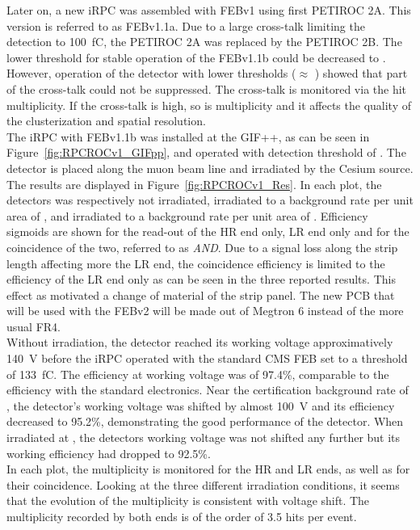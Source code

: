     Later on, a new iRPC was assembled with FEBv1 using first PETIROC 2A. This version is referred to as FEBv1.1a. Due to a large cross-talk limiting the detection to \SI{100}{fC}, the PETIROC 2A was replaced by the PETIROC 2B. The lower threshold for stable operation of the FEBv1.1b could be decreased to . However, operation of the detector with lower thresholds ($\approx$ ) showed that part of the cross-talk could not be suppressed. The cross-talk is monitored via the hit multiplicity. If the cross-talk is high, so is multiplicity and it affects the quality of the clusterization and spatial resolution.\\
    The iRPC with FEBv1.1b was installed at the GIF++, as can be seen in Figure~\ref{fig:RPCROCv1_GIFpp}, and operated with detection threshold of . The detector is placed along the muon beam line and irradiated by the Cesium source. The results are displayed in Figure~\ref{fig:RPCROCv1_Res}. In each plot, the detectors was respectively  not irradiated,  irradiated to a background rate per unit area of , and  irradiated to a background rate per unit area of . Efficiency sigmoids are shown for the read-out of the HR end only, LR end only and for the coincidence of the two, referred to as \textit{AND}. Due to a signal loss along the strip length affecting more the LR end, the coincidence efficiency is limited to the efficiency of the LR end only as can be seen in the three reported results. This effect as motivated a change of material of the strip panel. The new PCB that will be used with the FEBv2 will be made out of Megtron 6 instead of the more usual FR4.\\
    Without irradiation, the detector reached its working voltage approximatively \SI{140}{V} before the iRPC operated with the standard CMS FEB set to a threshold of \SI{133}{fC}. The efficiency at working voltage was of 97.4\%, comparable to the efficiency with the standard electronics. Near the certification background rate of , the detector's working voltage was shifted by almost \SI{100}{V} and its efficiency decreased to 95.2\%, demonstrating the good performance of the detector. When irradiated at , the detectors working voltage was not shifted any further but its working efficiency had dropped to 92.5\%.\\
    In each plot, the multiplicity is monitored for the HR and LR ends, as well as for their coincidence. Looking at the three different irradiation conditions, it seems that the evolution of the multiplicity is consistent with voltage shift. The multiplicity recorded by both ends is of the order of 3.5 hits per event.
    
